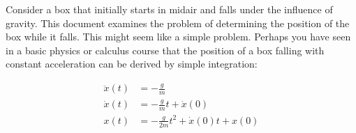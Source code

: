\documentclass{article}
\begin{document}
Consider a box that initially starts in midair and falls under the influence of gravity.  This document examines the problem of determining the position of the box while it falls.  This might seem like a simple problem.  Perhaps you have seen in a basic physics or calculus course that the position of a box falling with constant acceleration can be derived by simple integration:

\begin{align*}
\ddot{x}(t)&=-\frac{g}{m}\\
\dot{x}(t)&=-\frac{g}{m}t+\dot{x}(0)\\
x(t)&=-\frac{g}{2m}t^2+\dot{x}(0)t+x(0)
\end{align*}
\end{document}
